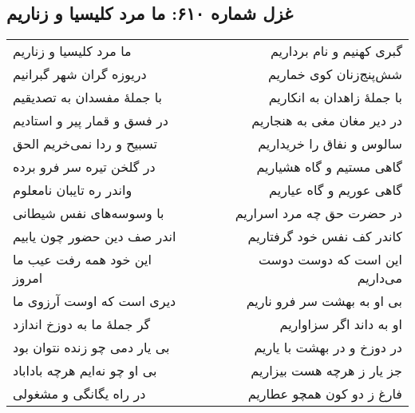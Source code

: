 \begin{center}
\section*{غزل شماره ۶۱۰: ما مرد کلیسیا و زناریم}
\label{sec:610}
\begin{longtable}{l p{0.5cm} r}
ما مرد کلیسیا و زناریم
&&
گبری کهنیم و نام برداریم
\\
دریوزه گران شهر گبرانیم
&&
شش‌پنج‌زنان کوی خماریم
\\
با جملهٔ مفسدان به تصدیقیم
&&
با جملهٔ زاهدان به انکاریم
\\
در فسق و قمار پیر و استادیم
&&
در دیر مغان مغی به هنجاریم
\\
تسبیح و ردا نمی‌خریم الحق
&&
سالوس و نفاق را خریداریم
\\
در گلخن تیره سر فرو برده
&&
گاهی مستیم و گاه هشیاریم
\\
واندر ره تایبان نامعلوم
&&
گاهی عوریم و گاه عیاریم
\\
با وسوسه‌های نفس شیطانی
&&
در حضرت حق چه مرد اسراریم
\\
اندر صف دین حضور چون یابیم
&&
کاندر کف نفس خود گرفتاریم
\\
این خود همه رفت عیب ما امروز
&&
این است که دوست دوست می‌داریم
\\
دیری است که اوست آرزوی ما
&&
بی او به بهشت سر فرو ناریم
\\
گر جملهٔ ما به دوزخ اندازد
&&
او به داند اگر سزاواریم
\\
بی یار دمی چو زنده نتوان بود
&&
در دوزخ و در بهشت با یاریم
\\
بی او چو نه‌ایم هرچه باداباد
&&
جز یار ز هرچه هست بیزاریم
\\
در راه یگانگی و مشغولی
&&
فارغ ز دو کون همچو عطاریم
\\
\end{longtable}
\end{center}
